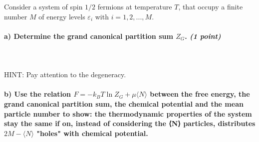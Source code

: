 Consider a system of spin $1/2$ fermions at temperature $T$, 
that occupy a finite number $M$ of energy levels 
$\varepsilon_i$ with $i=1,2,...,M$.


\paragraph{
    a) Determine the grand canonical partition sum $Z_G$.
    \textit{(1 point)}
} \ \\
    \\
    HINT: Pay attention to the degeneracy.

\paragraph{
    b) Use the relation $F=-k_BT\ln Z_G+\mu⟨N⟩$
    between the free energy, the grand canonical partition 
    sum, the chemical potential and the mean particle number 
    to show: the thermodynamic properties of the system stay 
    the same if on, instead of considering the 
    ⟨N⟩ particles, distributes $2M-⟨N⟩$ 
    "holes" with chemical potential.
}
